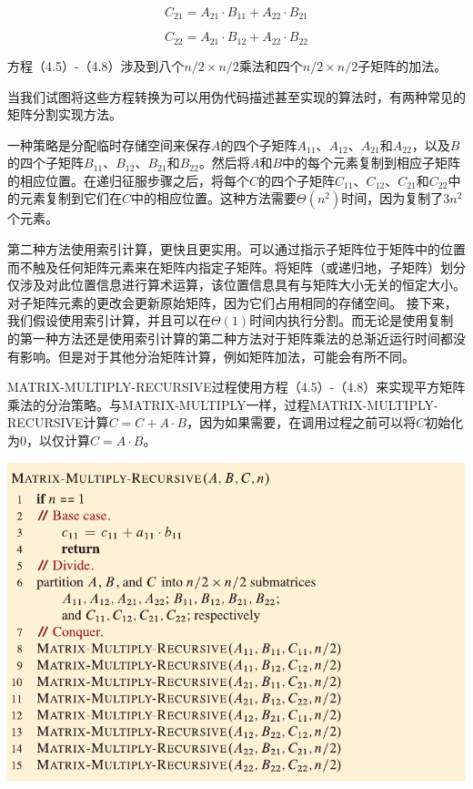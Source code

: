 \documentclass[lang=cn,newtx,10pt,scheme=chinese]{elegantbook}
\begin{document}
\begin{equation}
C_{21}=A_{21} \cdot B_{11}+A_{22} \cdot B_{21}
\end{equation}

\begin{equation}
C_{22}=A_{21} \cdot B_{12}+A_{22} \cdot B_{22}
\end{equation}

方程（4.5）-（4.8）涉及到八个$n / 2 \times n / 2$乘法和四个$n / 2 \times n / 2$子矩阵的加法。

当我们试图将这些方程转换为可以用伪代码描述甚至实现的算法时，有两种常见的矩阵分割实现方法。

一种策略是分配临时存储空间来保存$A$的四个子矩阵$A_{11}$、$A_{12}$、$A_{21}$和$A_{22}$，以及$B$的四个子矩阵$B_{11}$、$B_{12}$、$B_{21}$和$B_{22}$。然后将$A$和$B$中的每个元素复制到相应子矩阵的相应位置。在递归征服步骤之后，将每个$C$的四个子矩阵$C_{11}$、$C_{12}$、$C_{21}$和$C_{22}$中的元素复制到它们在$C$中的相应位置。这种方法需要$\Theta\left(n^2\right)$时间，因为复制了$3n^2$个元素。

第二种方法使用索引计算，更快且更实用。可以通过指示子矩阵位于矩阵中的位置而不触及任何矩阵元素来在矩阵内指定子矩阵。将矩阵（或递归地，子矩阵）划分仅涉及对此位置信息进行算术运算，该位置信息具有与矩阵大小无关的恒定大小。对子矩阵元素的更改会更新原始矩阵，因为它们占用相同的存储空间。
接下来，我们假设使用索引计算，并且可以在$\Theta(1)$时间内执行分割。而无论是使用复制的第一种方法还是使用索引计算的第二种方法对于矩阵乘法的总渐近运行时间都没有影响。但是对于其他分治矩阵计算，例如矩阵加法，可能会有所不同。

MATRIX-MULTIPLY-RECURSIVE过程使用方程（4.5）-（4.8）来实现平方矩阵乘法的分治策略。与MATRIX-MULTIPLY一样，过程MATRIX-MULTIPLY-RECURSIVE计算$C=C+A \cdot B$，因为如果需要，在调用过程之前可以将$C$初始化为0，以仅计算$C=A \cdot B$。

\includegraphics{算法导论第四版插图/第四章/递归矩阵相乘算法.pdf}
\end{document}
